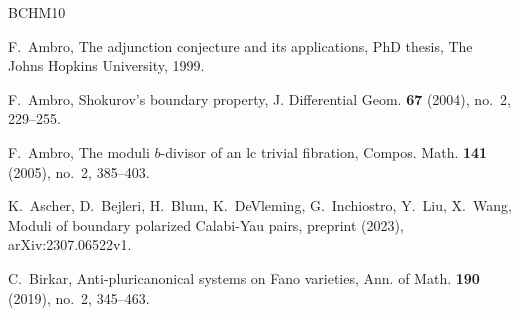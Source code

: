 \documentclass[12pt]{amsart}
\theoremstyle{definition}
\begin{document}
\begin{thebibliography}{BCHM10}



 F.~Ambro, The adjunction conjecture and its applications, PhD thesis, The Johns Hopkins University, 1999.



F.~Ambro, Shokurov's boundary property, J. Differential Geom. {\textbf{67}} (2004), no.~2, 229--255. 

F.~Ambro, The moduli $b$-divisor of an lc trivial fibration, Compos. Math. {\textbf{141}} (2005), no.~2, 385--403. 




 K.~Ascher, D.~Bejleri, H.~Blum, K.~DeVleming, G.~Inchiostro, Y.~Liu, X.~Wang, Moduli of boundary polarized Calabi-Yau pairs, preprint (2023), arXiv:2307.06522v1.






C.~Birkar, 
Anti-pluricanonical systems on Fano varieties, 
Ann. of Math. {\textbf{190}} (2019), no.~2, 345--463. 


\end{thebibliography}
\end{document}
